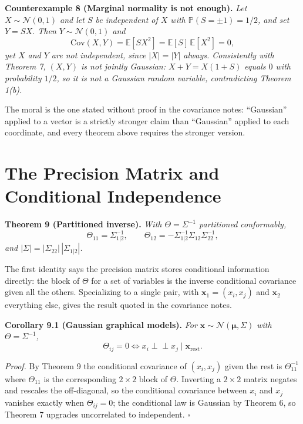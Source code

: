 \documentclass[conference]{IEEEtran}
\begin{document}
\medskip
\noindent\textbf{Counterexample 8 (Marginal normality is not enough).}
\textit{Let $X \sim \mathcal{N}(0,1)$ and let $S$ be independent of $X$ with $\mathbb{P}(S = \pm 1) = 1/2$, and set $Y = SX$. Then $Y \sim \mathcal{N}(0,1)$ and}
\begin{equation}
    \mathrm{Cov}(X,Y) = \mathbb{E}[SX^2] = \mathbb{E}[S]\,\mathbb{E}[X^2] = 0,
\end{equation}
\textit{yet $X$ and $Y$ are not independent, since $|X| = |Y|$ always. Consistently with Theorem 7, $(X,Y)$ is not jointly Gaussian: $X + Y = X(1+S)$ equals $0$ with probability $1/2$, so it is not a Gaussian random variable, contradicting Theorem 1(b).}

\medskip
The moral is the one stated without proof in the covariance notes: ``Gaussian'' applied to a vector is a strictly stronger claim than ``Gaussian'' applied to each coordinate, and every theorem above requires the stronger version.

\section*{The Precision Matrix and Conditional Independence}
\noindent\textbf{Theorem 9 (Partitioned inverse).}
\textit{With $\Theta = \Sigma^{-1}$ partitioned conformably,}
\begin{equation}
    \Theta_{11} = \Sigma_{1|2}^{-1},
    \qquad
    \Theta_{12} = -\Sigma_{1|2}^{-1}\Sigma_{12}\Sigma_{22}^{-1},
\end{equation}
\textit{and $|\Sigma| = |\Sigma_{22}|\,|\Sigma_{1|2}|$.}

\medskip
The first identity says the precision matrix stores conditional information directly: the block of $\Theta$ for a set of variables is the inverse conditional covariance given all the others. Specializing to a single pair, with $\mathbf{x}_1 = (x_i, x_j)$ and $\mathbf{x}_2$ everything else, gives the result quoted in the covariance notes.

\medskip
\noindent\textbf{Corollary 9.1 (Gaussian graphical models).}
\textit{For $\mathbf{x} \sim \mathcal{N}(\boldsymbol{\mu},\Sigma)$ with $\Theta = \Sigma^{-1}$,}
\begin{equation}
    \Theta_{ij} = 0 \iff x_i \perp\!\!\!\perp x_j \mid \mathbf{x}_{\text{rest}} .
\end{equation}

\medskip
\textit{Proof.} By Theorem 9 the conditional covariance of $(x_i,x_j)$ given the rest is $\Theta_{11}^{-1}$ where $\Theta_{11}$ is the corresponding $2\times 2$ block of $\Theta$. Inverting a $2\times2$ matrix negates and rescales the off-diagonal, so the conditional covariance between $x_i$ and $x_j$ vanishes exactly when $\Theta_{ij} = 0$; the conditional law is Gaussian by Theorem 6, so Theorem 7 upgrades uncorrelated to independent. $\square$
\end{document}
